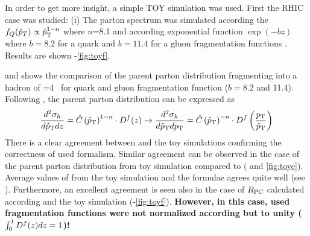 \documentclass[12pt]{article}
\begin{document}
In order to get more insight, a simple TOY simulation was used. First the RHIC case was studied: (i) The parton spectrum was simulated 
according the $f_Q(\hat{p}_T)\propto\hat{p}_{\rm T}^{1-n}$ where $n$=8.1 and \D{} according exponential function $\exp(-bz)$ where $b=8.2$ for a quark and $b=11.4$ for a gluon fragmentation functions \cite{Tannenbaum:2006ku}. Results are shown -\ref{fig:toyf}.

 and  shows the comparison of the parent parton distribution fragmenting into a hadron of \pt{}=4 \gevc\ for quark
and gluon fragmentation function ($b=8.2$ and 11.4). Following ,  the parent parton distribution can be expressed as
\begin{equation} \label{eq:parent}
        {d^2\sigma_h\over d\ensuremath{\hat{p}_{\rm T}}dz} = \hat{C}\left(\hat{p}_{\rm T}\right)^{1-n}\cdot D^f(z)
    \rightarrow
            {d^2\sigma_h\over d\ensuremath{\hat{p}_{\rm T}}d\ensuremath{p_{\rm T}}} = \hat{C}\left(\hat{p}_{\rm T}\right)^{-n}\cdot D^f\left({p_{\rm T}\over\hat{p}_{\rm T}}\right)
\end{equation}
There is a clear agreement between  and the toy simulations confirming the correctness of used formalism. Similar agreement can be observed in the case of the parent parton \mean{\zt} distribution from toy simulation compared to 
( and \ref{fig:toye}). Average values of \mzt{}  from the toy simulation and the formulae agrees quite well (see ). Furthermore, an excellent agreement is seen also in the case of $R_{\rm PC}$ calculated according 
 and the toy simulation (-\ref{fig:toyf}). {\bf However, in this case, used fragmentation functions were not normalized according  but to unity ($\int_0^1D^f(z)dz=1$)!}
\end{document}
